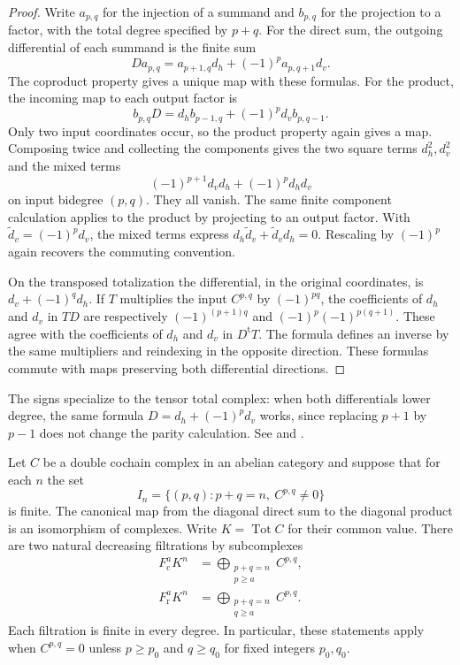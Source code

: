 \begin{proof}
Write \(a_{p,q}\) for the injection of a summand and \(b_{p,q}\) for the
projection to a factor, with the total degree specified by \(p+q\).
For the direct sum, the outgoing differential of each summand is the
finite sum
\[
  D a_{p,q}=a_{p+1,q}d_h+(-1)^p a_{p,q+1}d_v.
\]
The coproduct property gives a unique map with these formulas. For
the product, the incoming map to each output factor is
\[
  b_{p,q}D=d_h b_{p-1,q}+(-1)^p d_v b_{p,q-1}.
\]
Only two input coordinates occur, so the product property again gives
a map. Composing twice and collecting the components gives the two
square terms \(d_h^2,d_v^2\) and the mixed terms
\[
     (-1)^{p+1}d_vd_h+(-1)^p d_hd_v
\]
on input bidegree \((p,q)\). They all vanish. The same finite component
calculation applies to the product by projecting to an output factor.
With \(\widetilde d_v=(-1)^p d_v\), the mixed terms express
\(d_h\widetilde d_v+\widetilde d_vd_h=0\). Rescaling by \((-1)^p\)
again recovers the commuting convention.

On the transposed totalization the differential, in the original
coordinates, is \(d_v+(-1)^q d_h\). If \(T\) multiplies the input
\(C^{p,q}\) by \((-1)^{pq}\), the coefficients of \(d_h\) and \(d_v\)
in \(TD\) are respectively
\((-1)^{(p+1)q}\) and \((-1)^p(-1)^{p(q+1)}\).
These agree with the coefficients of \(d_h\) and \(d_v\) in
\(D^{\mathrm t}T\). The formula defines an inverse by the same
multipliers and reindexing in the opposite direction. These formulas
commute with maps preserving both differential directions.
\end{proof}

The signs specialize to the tensor total complex: when both differentials
lower degree, the same formula \(D=d_h+(-1)^p d_v\) works, since replacing
\(p+1\) by \(p-1\) does not change the parity calculation.
See \cite[Sections 5.1 and 5.6]{weibel} and
\cite[Chapter 12, Sections 18 and 25]{stacks-homology}.

\begin{lemma}
\label{res:B02}
Let \(C\) be a double cochain complex in an abelian category and suppose
that for each \(n\) the set
\[
    I_n=\{(p,q)\colon p+q=n,\ C^{p,q}\ne 0\}
\]
is finite. The canonical map from the diagonal direct sum to the diagonal
product is an isomorphism of complexes. Write \(K=\operatorname{Tot}C\)
for their common value. There are two natural decreasing filtrations by
subcomplexes
\begin{align*}
    F_{\mathrm c}^{a} K^n
       &=\bigoplus_{\substack{p+q=n\\p\ge a}} C^{p,q},\\
    F_{\mathrm r}^{a} K^n
       &=\bigoplus_{\substack{p+q=n\\q\ge a}} C^{p,q}.
\end{align*}
Each filtration is finite in every degree. In particular, these statements
apply when \(C^{p,q}=0\) unless \(p\ge p_0\) and \(q\ge q_0\) for fixed
integers \(p_0,q_0\).
\end{lemma}

